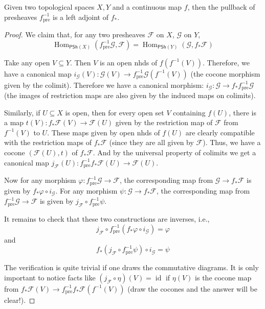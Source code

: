 \documentclass[12pt,letter]{article}
\newcommand{\Hom}[0]{\operatorname{Hom}}
\newcommand{\id}[0]{\operatorname{id}}
\begin{document}
	\begin{lemma}\label{l143}
		Given two topological spaces $X, Y$ and a continuous map $f$, then the pullback of presheaves $f_{\mathrm{pre}}^{-1}$ is a left adjoint of $f_*$.
	\end{lemma}
	\begin{proof}
		We claim that, for any two presheaves $\mathscr F$ on $X$, $\mathscr G$ on $Y$, 
		\[\Hom_{\mathsf{PSh}(X)}(f_{\mathrm{pre}}^{-1}\mathscr G, \mathscr F)=\Hom_{\mathsf{PSh}(Y)}(\mathscr G, f_*\mathscr F)\]
		
		Take any open $V\subseteq Y$. Then $V$ is an open nhds of $f(f^{-1}(V))$. Therefore, we have a canonical map $i_{\mathscr G}(V):\mathscr G(V)\to f_{\mathrm{pre}}^{-1}\mathscr G(f^{-1}(V))$ (the cocone morphism given by the colimit). Therefore we have a canonical morphism: $i_{\mathscr G}:\mathscr G\to f_*f_{\mathrm{pre}}^{-1}\mathscr G$ (the images of restriction maps are also given by the induced maps on colimits).

		Similarly, if $U\subseteq X$ is open, then for every open set $V$ containing $f(U)$, there is a map $t(V):f_*\mathscr F(V)\to \mathscr F(U)$ given by the restriction map of $\mathscr F$ from $f^{-1}(V)$ to $U$. These maps given by open nhds of $f(U)$ are clearly compatible with the restriction maps of $f_*\mathscr F$ (since they are all given by $\mathscr F$). Thus, we have a cocone $(\mathscr F(U), t)$ of $f_*\mathscr F$. And by the universal property of colimits we get a canonical map $j_{\mathscr F}(U):f_{\mathrm{pre}}^{-1}f_*\mathscr F(U)\to \mathscr F(U)$.

		Now for any morphism $\varphi:f_{\mathrm{pre}}^{-1}\mathscr G\to \mathscr F$, the corresponding map from $\mathscr G\to f_*\mathscr F$ is given by $f_*\varphi\circ i_{\mathscr G}$. For any morphism $\psi:\mathscr G\to f_*\mathscr F$, the corresponding map from $f_{\mathrm{pre}}^{-1}\mathscr G\to \mathscr F$ is given by $j_{\mathscr F}\circ f_{\mathrm{pre}}^{-1}\psi$.

		It remains to check that these two constructions are inverses, i.e.,
		\[j_{\mathscr F}\circ f_{\mathrm{pre}}^{-1}(f_*\varphi\circ i_{\mathscr G})=\varphi\]
		and
		\[f_*(j_{\mathscr F}\circ f_{\mathrm{pre}}^{-1}\psi)\circ i_{\mathscr G}=\psi\]

		The verification is quite trivial if one draws the commutative diagrams. It is only important to notice facts like $(j_{\mathscr F}\circ\eta)(V)=\id$ if $\eta(V)$ is the cocone map from $f_*\mathscr F(V)\to f^{-1}_{\mathrm{pre}}f_*\mathscr F(f^{-1}(V))$ (draw the cocones and the answer will be clear!).
	\end{proof}
\end{document}
